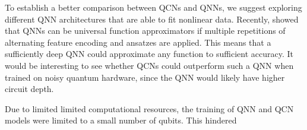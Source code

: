 To establish a better comparison between QCNs and QNNs, we suggest exploring different QNN architectures that are able to fit nonlinear data. Recently, \citet{Schuld_2021} showed that QNNs can be universal function approximators if multiple repetitions of alternating feature encoding and ansatzes are applied. This means that a sufficiently deep QNN could approximate any function to sufficient accuracy. It would be interesting to see whether QCNs could outperform such a QNN when trained on noisy quantum hardware, since the QNN would likely have higher circuit depth.

Due to limited limited computational resources, the training of QNN and QCN models were limited to a small number of qubits. This hindered 




